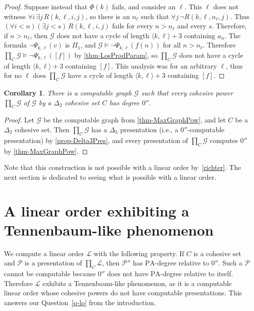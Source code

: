 \documentclass[11pt,a4paper,reqno]{amsart}
\newtheorem{Corollary}[Theorem]{Corollary}
\theoremstyle{definition}
\newcommand{\pa}{\mathrm{PA}}
\newcommand{\la}{\langle}
\newcommand{\ra}{\rangle}
\newcommand{\mc}[1]{\mathcal{#1}}
\begin{document}
\begin{proof}
Suppose instead that $\Phi(k)$ fails, and consider an $\ell$.  This $\ell$ does not witness $\forall i\, \exists j\, R(k,\ell,i,j)$, so there is an $n_\ell$ such that $\forall j\, \neg R(k,\ell,n_\ell,j)$.  Thus $(\forall i < n)(\exists j < s)\, R(k,\ell,i,j)$ fails for every $n > n_\ell$ and every $s$.  Therefore, if $n > n_\ell$, then $\mc{G}$ does not have a cycle of length $\la k, \ell \ra + 3$ containing $a_n$.  The formula $\neg \Psi_{k,\ell}(v)$ is $\Pi_1$, and $\mc{G} \models \neg\Psi_{k,\ell}(f(n))$ for all $n > n_\ell$.  Therefore $\prod_C \mc{G} \models \neg\Psi_{k,\ell}([f])$ by \cref{thm-LosProdParam}, so $\prod_C \mc{G}$ does not have a cycle of length $\la k, \ell \ra + 3$ containing $[f]$.  This analysis was for an arbitrary $\ell$, thus for no $\ell$ does $\prod_C \mc{G}$ have a cycle of length $\la k, \ell \ra + 3$ containing $[f]$.
\end{proof}

\begin{Corollary}\label{cor-degDJ}
There is a computable graph $\mc{G}$ such that every cohesive power $\prod_C \mc{G}$ of $\mc{G}$ by a $\Delta_2$ cohesive set $C$ has degree $0''$.
\end{Corollary}

\begin{proof}
Let $\mc{G}$ be the computable graph from \cref{thm-MaxGraphPow}, and let $C$ be a $\Delta_2$ cohesive set.  Then $\prod_C \mc{G}$ has a $\Delta_3$ presentation (i.e., a $0''$-computable presentation) by \cref{prop-Delta3Pres}, and every presentation of $\prod_C \mc{G}$ computes $0''$ by \cref{thm-MaxGraphPow}.
\end{proof}

Note that this construction is not possible with a linear order by~\cref{richter}.
The next section is dedicated to seeing what is possible with a linear order.

\section{A linear order exhibiting a Tennenbaum-like phenomenon}\label{sec-lo}

We compute a linear order $\mc{L}$ with the following property.  If $C$ is a cohesive set and $\mc{P}$ is a presentation of $\prod_C \mc{L}$, then $\mc{P}''$ has $\pa$-degree relative to $0''$.  Such a $\mc{P}$ cannot be computable because $0''$ does not have $\pa$-degree relative to itself.  Therefore $\mc{L}$ exhibits a Tennenbaum-like phenomenon, as it is a computable linear order whose cohesive powers do not have computable presentations.  This answers our Question~\ref{q-lo} from the introduction.
\end{document}
